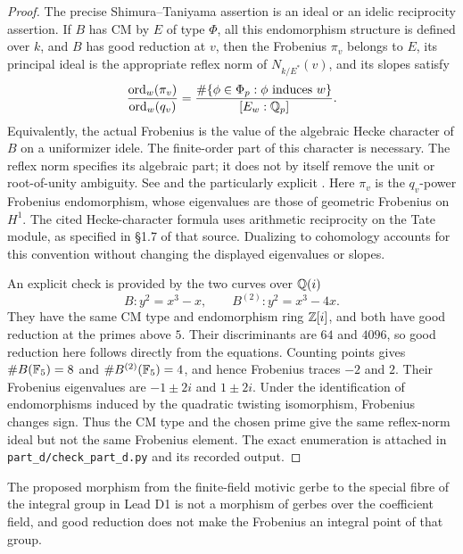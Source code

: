 \begin{proof}
The precise Shimura--Taniyama assertion is an ideal or an idelic
reciprocity assertion.  If $B$ has CM by $E$ of type $\Phi$, all this
endomorphism structure is defined over $k$, and $B$ has good reduction at
$v$, then the Frobenius $\pi_v$ belongs to $E$, its principal ideal is
the appropriate reflex norm of $N_{k/E^*}(v)$, and its slopes satisfy
\begin{equation}
 \frac{\operatorname{ord}_w(\pi_v)}{\operatorname{ord}_w(q_v)}
 =\frac{\#\{\phi\in\Phi_p:\phi\text{ induces }w\}}
 {[E_w:\mathbb Q_p]}.
 \label{eq:d-st-slopes}
\end{equation}
Equivalently, the actual Frobenius is the value of the algebraic Hecke
character of $B$ on a uniformizer idele.  The finite-order part of this
character is necessary.  The reflex norm specifies its algebraic part;
it does not by itself remove the unit or root-of-unity ambiguity.
See \citet[Theorem 8.1, Remark 8.6(b), and Theorems 9.3 and 9.10]{DMilneCM2020}
and the particularly explicit
\citet[Theorem 5.1(ii)--(v)]{DCCO2008}.
Here $\pi_v$ is the $q_v$-power Frobenius endomorphism, whose
eigenvalues are those of geometric Frobenius on $H^1$.  The cited
Hecke-character formula uses arithmetic reciprocity on the Tate
module, as specified in \S1.7 of that source.  Dualizing to
cohomology accounts for this convention without changing the
displayed eigenvalues or slopes.

An explicit check is provided by the two curves over $\mathbb Q(i)$
\[
 B:y^2=x^3-x,
 \qquad B^{(2)}:y^2=x^3-4x.
\]
They have the same CM type and endomorphism ring $\mathbb Z[i]$, and both have
good reduction at the primes above $5$.  Their discriminants are $64$
and $4096$, so good reduction here follows directly from the equations.
Counting points gives
$\#B(\mathbb F_5)=8$ and $\#B^{(2)}(\mathbb F_5)=4$, and hence Frobenius traces
$-2$ and $2$.  Their Frobenius eigenvalues are
$-1\pm2i$ and $1\pm2i$.  Under the identification of endomorphisms
induced by the quadratic twisting isomorphism, Frobenius changes sign.
Thus the CM type and the chosen prime give the same reflex-norm ideal
but not the same Frobenius element.  The exact enumeration is attached
in \texttt{part\_d/check\_part\_d.py} and its recorded output.
\end{proof}

\begin{proposition}
\label{prop:d-special-fibre-false}
The proposed morphism from the finite-field motivic gerbe to the
special fibre of the integral group in Lead D1 is not a morphism of
gerbes over the coefficient field, and good reduction does not make
the Frobenius an integral point of that group.
\end{proposition}

